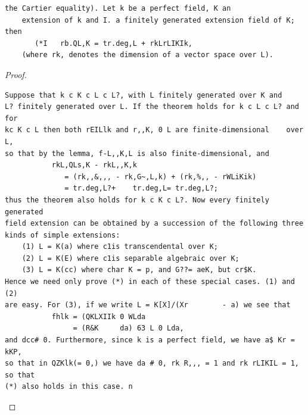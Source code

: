 \begin{theorem}\label{mcrt-auto-theorem-26-10}\uses{}
\begin{verbatim}
the Cartier equality). Let k be a perfect field, K an
    extension of k and I. a finitely generated extension field of K; then
       (*I   rb.QL,K = tr.deg,L + rkLrLIKIk,
    (where rk, denotes the dimension of a vector space over L).
\end{verbatim}
\end{theorem}
\begin{proof}
\begin{verbatim}
Suppose that k c K c L c L?, with L finitely generated over K and
L? finitely generated over L. If the theorem holds for k c L c L? and for
kc K c L then both rEILlk and r,,K, 0 L are finite-dimensional    over L,
so that by the lemma, f-L,,K,L is also finite-dimensional, and
           rkL,QLs,K - rkL,,K,k
              = (rk,,&,,, - rk,G~,L,k) + (rk,%,, - rWLiKik)
              = tr.deg,L?+    tr.deg,L= tr.deg,L?;
thus the theorem also holds for k c K c L?. Now every finitely generated
field extension can be obtained by a succession of the following three
kinds of simple extensions:
    (1) L = K(a) where c1is transcendental over K;
    (2) L = K(E) where c1is separable algebraic over K;
    (3) L = K(cc) where char K = p, and G??= aeK, but cr$K.
Hence we need only prove (*) in each of these special cases. (1) and (2)
are easy. For (3), if we write L = K[X]/(Xr        - a) we see that
           fhlk = (QKLXIIk 0 WLda
                = (R&K     da) 63 L 0 Lda,
and dcc# 0. Furthermore, since k is a perfect field, we have a$ Kr = kKP,
so that in QZKlk(= 0,) we have da # 0, rk R,,, = 1 and rk rLIKIL = 1, so that
(*) also holds in this case. n
\end{verbatim}
\end{proof}


